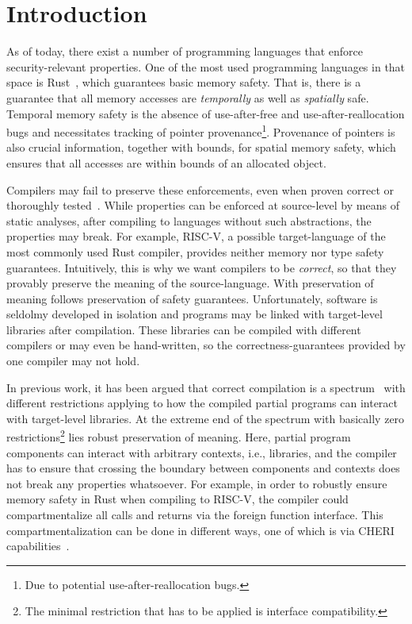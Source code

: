 

\section{Introduction}\label{sec:introduction}

As of today, there exist a number of programming languages that enforce security-relevant properties.
One of the most used programming languages in that space is Rust~\cite{}, which guarantees basic memory safety.
That is, there is a guarantee that all memory accesses are {\em temporally} as well as {\em spatially} safe. 
Temporal memory safety is the absence of use-after-free and use-after-reallocation bugs and necessitates tracking of pointer provenance\footnote{Due to potential use-after-reallocation bugs.}. %
Provenance of pointers is also crucial information, together with bounds, for spatial memory safety, which ensures that all accesses are within bounds of an allocated object.

Compilers may fail to preserve these enforcements, even when proven correct or thoroughly tested~\cite{}.
While properties can be enforced at source-level by means of static analyses, after compiling to languages without such abstractions, the properties may break.
For example, RISC-V, a possible target-language of the most commonly used Rust compiler,  provides neither memory nor type safety guarantees.
Intuitively, this is why we want compilers to be {\em correct}, so that they provably preserve the meaning of the source-language.
With preservation of meaning follows preservation of safety guarantees.
Unfortunately, software is seldolmy developed in isolation and programs may be linked with target-level libraries after compilation.
These libraries can be compiled with different compilers or may even be hand-written, so the correctness-guarantees provided by one compiler may not hold.

In previous work, it has been argued that correct compilation is a spectrum~\cite{} with different restrictions applying to how the compiled partial programs can interact with target-level libraries.
At the extreme end of the spectrum with basically zero restrictions\footnote{The minimal restriction that has to be applied is interface compatibility.} lies robust preservation of meaning.
Here, partial program components can interact with arbitrary contexts, i.e., libraries, and the compiler has to ensure that crossing the boundary between components and contexts does not break any properties whatsoever.
For example, in order to robustly ensure memory safety in Rust when compiling to RISC-V, the compiler could compartmentalize all calls and returns via the foreign function interface.
This compartmentalization can be done in different ways, one of which is via CHERI capabilities~\cite{}.

